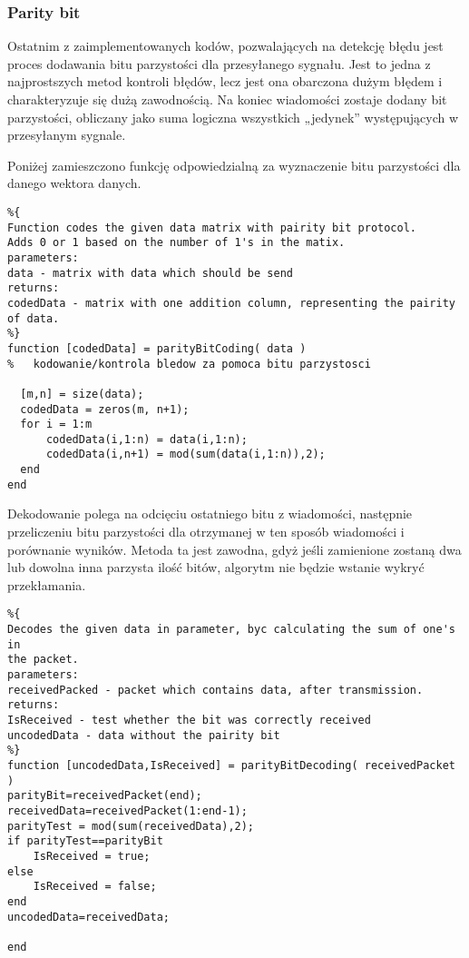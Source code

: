 \documentclass{article}
\begin{document}
\subsubsection{Parity bit}

Ostatnim z zaimplementowanych kodów, pozwalających na detekcję błędu jest proces dodawania bitu parzystości dla przesyłanego sygnału. Jest to jedna z najprostszych metod kontroli błędów, lecz jest ona obarczona dużym błędem i charakteryzuje się dużą zawodnością.
Na koniec wiadomości zostaje dodany bit parzystości, obliczany jako suma logiczna wszystkich „jedynek” występujących w przesyłanym sygnale.

\vspace{2mm}
\noindent
Poniżej zamieszczono funkcję odpowiedzialną za wyznaczenie bitu parzystości dla danego wektora danych.

\newpage

\begin{verbatim}
%{
Function codes the given data matrix with pairity bit protocol.
Adds 0 or 1 based on the number of 1's in the matix.
parameters:
data - matrix with data which should be send
returns:
codedData - matrix with one addition column, representing the pairity
of data.
%}
function [codedData] = parityBitCoding( data )
%   kodowanie/kontrola bledow za pomoca bitu parzystosci

  [m,n] = size(data);
  codedData = zeros(m, n+1);
  for i = 1:m
      codedData(i,1:n) = data(i,1:n);
      codedData(i,n+1) = mod(sum(data(i,1:n)),2);
  end
end
\end{verbatim}

 Dekodowanie polega na odcięciu ostatniego bitu z wiadomości, następnie przeliczeniu bitu parzystości dla otrzymanej w ten sposób wiadomości i porównanie wyników. Metoda ta jest zawodna, gdyż jeśli zamienione zostaną dwa lub dowolna inna parzysta ilość bitów, algorytm nie będzie wstanie wykryć przekłamania. 
 
\begin{verbatim}
%{
Decodes the given data in parameter, byc calculating the sum of one's in
the packet.
parameters:
receivedPacked - packet which contains data, after transmission.
returns:
IsReceived - test whether the bit was correctly received
uncodedData - data without the pairity bit
%}
function [uncodedData,IsReceived] = parityBitDecoding( receivedPacket )
parityBit=receivedPacket(end);
receivedData=receivedPacket(1:end-1);
parityTest = mod(sum(receivedData),2);
if parityTest==parityBit
    IsReceived = true;
else
    IsReceived = false;
end
uncodedData=receivedData;

end
\end{verbatim}
\end{document}
